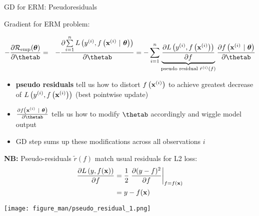\documentclass[11pt,compress,t,notes=noshow, xcolor=table]{beamer}
\begin{document}
\begin{vbframe}{GD for ERM: Pseudoresiduals}

\begin{footnotesize}

Gradient for ERM problem: 

\vspace*{-0.5cm}

\begin{eqnarray*}
- \pd{\risket}{\thetab} &=& - \pd{\sumin \Lxyit}{\thetab}= - \sumin \underbrace{\pd{\Lxyi}{f}}_{\text{pseudo residual } \tilde r^{(i)}(f)} \pd{\fxit}{\thetab}
\end{eqnarray*}

\vspace*{-0.5cm}

\begin{itemize}
	\item \textbf{pseudo residuals} tell us how to distort $f\left(\mathbf{x}^{(i)}\right)$ to achieve greatest decrease of $L\left(y^{(i)}, f\left(\mathbf{x}^{(i)}\right)\right)$ (best pointwise update)
	\item $\pd{\fxit}{\thetab}$ tells us how to modify $\thetab$ accordingly and wiggle model output
	\item GD step sums up these modifications across all observations $i$
\end{itemize}

\begin{minipage}[b]{0.45\textwidth}
  \textbf{NB:} Pseudo-residuals 
  $\tilde{r}\left( f \right)$ 
  match usual residuals for L2 loss:
  \begin{align*}
  \frac{\partial{L\left(y, f(\mathbf{x})\right)}}{\partial f} & = \frac{1}{2} \left. \frac{\partial{(y - f)^2}}{\partial f} \right|_{f = f(\mathbf{x})}\\ 
                   & = y - f(\mathbf{x})
  \end{align*}
\end{minipage}%
\begin{minipage}[b]{0.05\textwidth}
   \phantom{foo}
\end{minipage}
\begin{minipage}[b]{0.45\textwidth}
  \texttt{[image: figure\_man/pseudo\_residual\_1.png]}
\end{minipage}

\end{footnotesize}


\end{vbframe}


\endlecture
\end{document}

